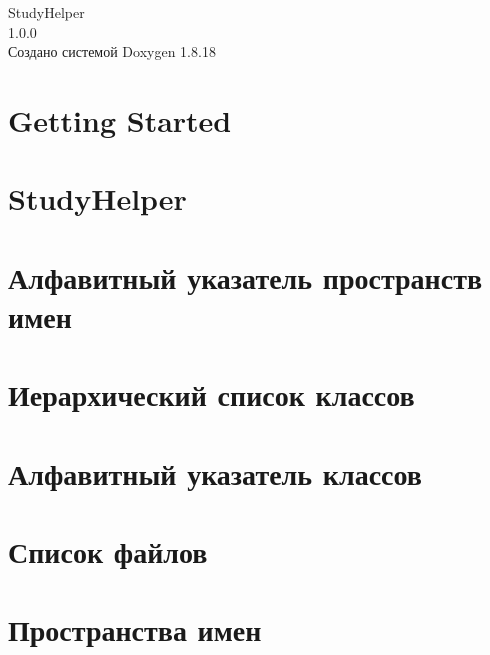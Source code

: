 \let\mypdfximage\pdfximage\def\pdfximage{\immediate\mypdfximage}\documentclass[twoside]{book}
\newcommand{\+}{\discretionary{\mbox{\scriptsize$\hookleftarrow$}}{}{}}
\newcommand{\clearemptydoublepage}{%
  \newpage{\pagestyle{empty}\cleardoublepage}%
}
\begin{document}
\hypersetup{pageanchor=false,
             bookmarksnumbered=true,
             pdfencoding=unicode
            }
\begin{titlepage}
\vspace*{7cm}
\begin{center}%
{\Large Study\+Helper \\[1ex]\large 1.\+0.\+0 }\\
\vspace*{1cm}
{\large Создано системой Doxygen 1.8.18}\\
\end{center}
\end{titlepage}
\clearemptydoublepage
{}
\tableofcontents
\clearemptydoublepage
{}
\hypersetup{pageanchor=true}

\chapter{Getting Started}
\label{md__c_1__users_mag13__desktop__study_helper__h_e_l_p}

\chapter{Study\+Helper}
\label{md__c_1__users_mag13__desktop__study_helper__r_e_a_d_m_e}

\chapter{Алфавитный указатель пространств имен}

\chapter{Иерархический список классов}

\chapter{Алфавитный указатель классов}

\chapter{Список файлов}

\chapter{Пространства имен}






\end{document}

